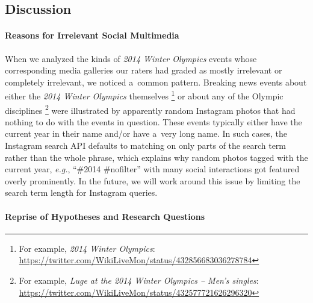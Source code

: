 \documentclass{sig-alternate}
\newcommand{\inlinelistingsize}{\fontsize{8pt}{11pt}}
\let\oldurl\url
\renewcommand{\url}[1]{\inlinelistingsize\oldurl{#1}}
\begin{document}
\subsection{Discussion}

\paragraph{Reasons for Irrelevant Social Multimedia}

When we analyzed the kinds of \emph{2014 Winter Olympics} events
whose corresponding media galleries our raters
had graded as mostly irrelevant or completely irrelevant,
we noticed a~common pattern.
Breaking news events about either the
\emph{2014 Winter Olympics} themselves%
\footnote{For example, \emph{2014 Winter Olympics}:
\url{https://twitter.com/WikiLiveMon/status/432856683036278784}}
or about any of the Olympic disciplines%
\footnote{For example, \emph{Luge at the 2014 Winter Olympics -- Men's singles}:
\url{https://twitter.com/WikiLiveMon/status/432577721626296320}}
were illustrated by apparently random Instagram photos
that had nothing to do with the events in question. 
These events typically either have the current year in their name
and/or have a~very long name.
In such cases, the Instagram search API defaults to matching
on only parts of the search term rather than the whole phrase,
which explains why random photos tagged with the current year,
\emph{e.g.}, ``\#2014 \#nofilter'' with many social interactions
got featured overly prominently.
In the future, we will work around this issue by limiting the search term
length for Instagram queries.

\paragraph{Reprise of Hypotheses and Research Questions}
\end{document}
